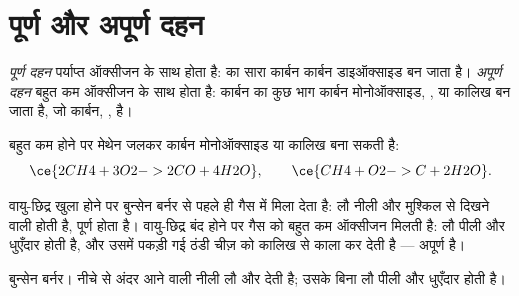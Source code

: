 \section{पूर्ण और अपूर्ण दहन}

\begin{definition}[पूर्ण और अपूर्ण दहन]\label{def:g8:combustion-and-fuels:complete}
\emph{पूर्ण दहन} पर्याप्त ऑक्सीजन के साथ होता है:
 का सारा कार्बन कार्बन डाइऑक्साइड बन जाता है।
\emph{अपूर्ण दहन} बहुत कम ऑक्सीजन के साथ होता
है: कार्बन का कुछ भाग कार्बन मोनोऑक्साइड,
, या कालिख बन जाता है, जो कार्बन, , है।
\end{definition}

\begin{example}[ऑक्सीजन की कमी में मेथेन]\label{ex:g8:combustion-and-fuels:incomplete}
बहुत कम  होने पर मेथेन जलकर कार्बन मोनोऑक्साइड या कालिख बना सकती है:
\[
  \ce{2CH4 + 3O2 -> 2CO + 4H2O}, \qquad \ce{CH4 + O2 -> C + 2H2O}.
\]
\end{example}

\begin{proposition}[लौ को पढ़ना]\label{prop:g8:combustion-and-fuels:flame}
वायु-छिद्र खुला होने पर बुन्सेन बर्नर  से पहले ही गैस में  मिला देता
है: लौ नीली और मुश्किल से दिखने वाली होती है,  पूर्ण होता है।
वायु-छिद्र बंद होने पर गैस को बहुत कम ऑक्सीजन मिलती है: लौ पीली और धुएँदार
होती है, और उसमें पकड़ी गई ठंडी चीज़ को कालिख से काला कर देती है ---
 अपूर्ण है।
\end{proposition}

\begin{omfigure}

{\small बुन्सेन बर्नर। नीचे से अंदर आने वाली  नीली लौ और 
देती है; उसके बिना लौ पीली और धुएँदार होती है।}
\end{omfigure}

